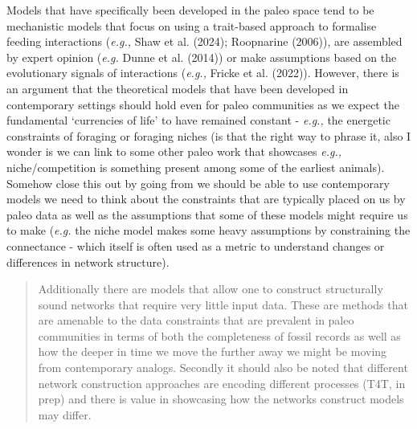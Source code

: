 \documentclass[
]{article}
\begin{document}
Models that have specifically been developed in the paleo space tend to
be mechanistic models that focus on using a trait-based approach to
formalise feeding interactions (\emph{e.g.,} Shaw et al. (2024);
Roopnarine (2006)), are assembled by expert opinion (\emph{e.g.} Dunne
et al. (2014)) or make assumptions based on the evolutionary signals of
interactions (\emph{e.g.,} Fricke et al. (2022)). However, there is an
argument that the theoretical models that have been developed in
contemporary settings should hold even for paleo communities as we
expect the fundamental `currencies of life' to have remained constant -
\emph{e.g.,} the energetic constraints of foraging or foraging niches
(is that the right way to phrase it, also I wonder is we can link to
some other paleo work that showcases \emph{e.g.,} niche/competition is
something present among some of the earliest animals). Somehow close
this out by going from we should be able to use contemporary models we
need to think about the constraints that are typically placed on us by
paleo data as well as the assumptions that some of these models might
require us to make (\emph{e.g.} the niche model makes some heavy
assumptions by constraining the connectance - which itself is often used
as a metric to understand changes or differences in network structure).

\begin{quote}
Additionally there are models that allow one to construct structurally
sound networks that require very little input data. These are methods
that are amenable to the data constraints that are prevalent in paleo
communities in terms of both the completeness of fossil records as well
as how the deeper in time we move the further away we might be moving
from contemporary analogs. Secondly it should also be noted that
different network construction approaches are encoding different
processes (T4T, in prep) and there is value in showcasing how the
networks construct models may differ.
\end{quote}
\end{document}

